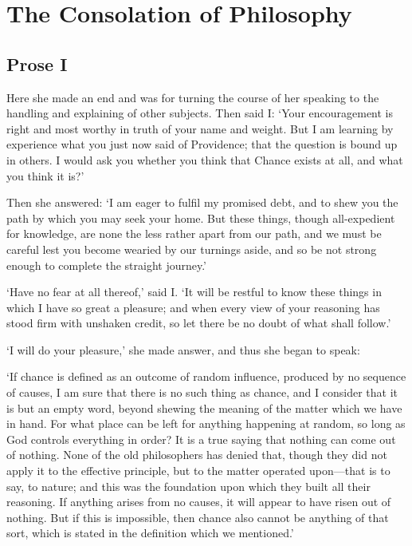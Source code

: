 
\author{Boethius}
\chapter[The Consolation of Philosophy, bk. 5]{The Consolation of
Philosophy}

\section*{Prose I}

Here she made an end and was for turning the course of her speaking to
the handling and explaining of other subjects. Then said I: `Your
encouragement is right and most worthy in truth of your name and
weight. But I am learning by experience what you just now said of
Providence; that the question is bound up in others. I would ask you
whether you think that Chance exists at all, and what you think it
is?'

Then she answered: `I am eager to fulfil my promised debt, and to shew
you the path by which you may seek your home. But these things, though
all-expedient for knowledge, are none the less rather apart from our
path, and we must be careful lest you become wearied by our turnings
aside, and so be not strong enough to complete the straight journey.'

`Have no fear at all thereof,' said I. `It will be restful to know
these things in which I have so great a pleasure; and when every view
of your reasoning has stood firm with unshaken credit, so let there be
no doubt of what shall follow.'

`I will do your pleasure,' she made answer, and thus she began to
speak:

`If chance is defined as an outcome of random influence,
produced by no sequence of causes, I am sure that there is no such
thing as chance, and I consider that it is but an empty word, beyond
shewing the meaning of the matter which we have in hand. For what
place can be left for anything happening at random, so long as God
controls everything in order? It is a true saying that nothing can
come out of nothing. None of the old philosophers has denied that,
though they did not apply it to the effective principle, but to the
matter operated upon---that is to say, to nature; and this was the
foundation upon which they built all their reasoning. If anything
arises from no causes, it will appear to have risen out of nothing.
But if this is impossible, then chance also cannot be anything of
that sort, which is stated in the definition which we mentioned.'

